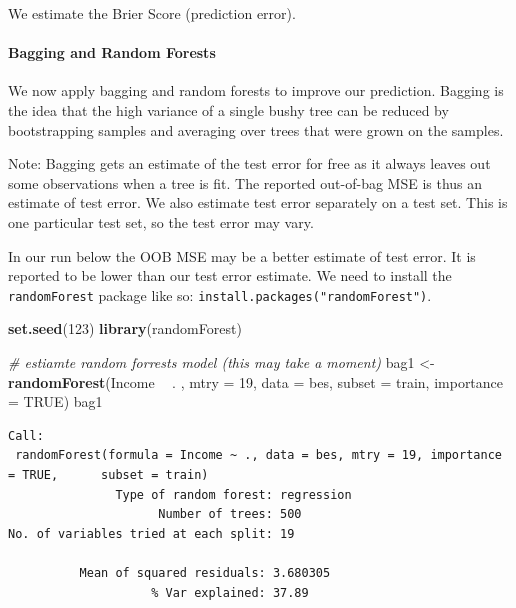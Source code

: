 \documentclass[]{article}
\newenvironment{Shaded}{\begin{snugshade}}{\end{snugshade}}
\newcommand{\CommentTok}[1]{\textcolor[rgb]{0.56,0.35,0.01}{\textit{#1}}}
\newcommand{\DataTypeTok}[1]{\textcolor[rgb]{0.13,0.29,0.53}{#1}}
\newcommand{\DecValTok}[1]{\textcolor[rgb]{0.00,0.00,0.81}{#1}}
\newcommand{\KeywordTok}[1]{\textcolor[rgb]{0.13,0.29,0.53}{\textbf{#1}}}
\newcommand{\NormalTok}[1]{#1}
\newcommand{\OperatorTok}[1]{\textcolor[rgb]{0.81,0.36,0.00}{\textbf{#1}}}
\newcommand{\OtherTok}[1]{\textcolor[rgb]{0.56,0.35,0.01}{#1}}
\newcommand{\StringTok}[1]{\textcolor[rgb]{0.31,0.60,0.02}{#1}}
\let\oldparagraph\paragraph
\renewcommand{\paragraph}[1]{\oldparagraph{#1}\mbox{}}
\begin{document}
We estimate the Brier Score (prediction error).

\begin{Shaded}
\end{Shaded}

\hypertarget{bagging-and-random-forests}{%
\paragraph{Bagging and Random Forests}\label{bagging-and-random-forests}}

We now apply bagging and random forests to improve our prediction. Bagging is the idea that the high variance of a single bushy tree can be reduced by bootstrapping samples and averaging over trees that were grown on the samples.

Note: Bagging gets an estimate of the test error for free as it always leaves out some observations when a tree is fit. The reported out-of-bag MSE is thus an estimate of test error. We also estimate test error separately on a test set. This is one particular test set, so the test error may vary.

In our run below the OOB MSE may be a better estimate of test error. It is reported to be lower than our test error estimate. We need to install the \texttt{randomForest} package like so: \texttt{install.packages("randomForest")}.

\begin{Shaded}
\begin{Highlighting}[]
\KeywordTok{set.seed}\NormalTok{(}\DecValTok{123}\NormalTok{)}
\KeywordTok{library}\NormalTok{(randomForest)}

\CommentTok{# estiamte random forrests model (this may take a moment)}
\NormalTok{bag1 <-}\StringTok{ }\KeywordTok{randomForest}\NormalTok{(Income }\OperatorTok{~}\StringTok{ }\NormalTok{. , }\DataTypeTok{mtry =} \DecValTok{19}\NormalTok{, }\DataTypeTok{data =}\NormalTok{ bes, }\DataTypeTok{subset =}\NormalTok{ train, }\DataTypeTok{importance =} \OtherTok{TRUE}\NormalTok{)}
\NormalTok{bag1}
\end{Highlighting}
\end{Shaded}

\begin{verbatim}
Call:
 randomForest(formula = Income ~ ., data = bes, mtry = 19, importance = TRUE,      subset = train) 
               Type of random forest: regression
                     Number of trees: 500
No. of variables tried at each split: 19

          Mean of squared residuals: 3.680305
                    % Var explained: 37.89
                
\end{verbatim}
\end{document}
